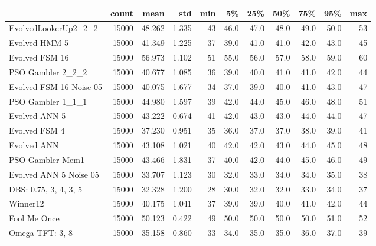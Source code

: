 \begin{tabular}{lrrrrrrrrrr}
\toprule
{} &  count &    mean &    std &  min &    5\% &   25\% &   50\% &   75\% &   95\% &  max \\
\midrule
EvolvedLookerUp2\_2\_2    &  15000 &  48.262 &  1.335 &   43 &  46.0 &  47.0 &  48.0 &  49.0 &  50.0 &   53 \\
Evolved HMM 5           &  15000 &  41.349 &  1.225 &   37 &  39.0 &  41.0 &  41.0 &  42.0 &  43.0 &   45 \\
Evolved FSM 16          &  15000 &  56.973 &  1.102 &   51 &  55.0 &  56.0 &  57.0 &  58.0 &  59.0 &   60 \\
PSO Gambler 2\_2\_2       &  15000 &  40.677 &  1.085 &   36 &  39.0 &  40.0 &  41.0 &  41.0 &  42.0 &   44 \\
Evolved FSM 16 Noise 05 &  15000 &  40.075 &  1.677 &   34 &  37.0 &  39.0 &  40.0 &  41.0 &  43.0 &   47 \\
PSO Gambler 1\_1\_1       &  15000 &  44.980 &  1.597 &   39 &  42.0 &  44.0 &  45.0 &  46.0 &  48.0 &   51 \\
Evolved ANN 5           &  15000 &  43.222 &  0.674 &   41 &  42.0 &  43.0 &  43.0 &  44.0 &  44.0 &   47 \\
Evolved FSM 4           &  15000 &  37.230 &  0.951 &   35 &  36.0 &  37.0 &  37.0 &  38.0 &  39.0 &   41 \\
Evolved ANN             &  15000 &  43.108 &  1.021 &   40 &  42.0 &  42.0 &  43.0 &  44.0 &  45.0 &   48 \\
PSO Gambler Mem1        &  15000 &  43.466 &  1.831 &   37 &  40.0 &  42.0 &  44.0 &  45.0 &  46.0 &   49 \\
Evolved ANN 5 Noise 05  &  15000 &  33.707 &  1.123 &   30 &  32.0 &  33.0 &  34.0 &  34.0 &  35.0 &   38 \\
DBS: 0.75, 3, 4, 3, 5   &  15000 &  32.328 &  1.200 &   28 &  30.0 &  32.0 &  32.0 &  33.0 &  34.0 &   37 \\
Winner12                &  15000 &  40.175 &  1.041 &   37 &  39.0 &  39.0 &  40.0 &  41.0 &  42.0 &   44 \\
Fool Me Once            &  15000 &  50.123 &  0.422 &   49 &  50.0 &  50.0 &  50.0 &  50.0 &  51.0 &   52 \\
Omega TFT: 3, 8         &  15000 &  35.158 &  0.860 &   33 &  34.0 &  35.0 &  35.0 &  36.0 &  37.0 &   39 \\
\bottomrule
\end{tabular}
